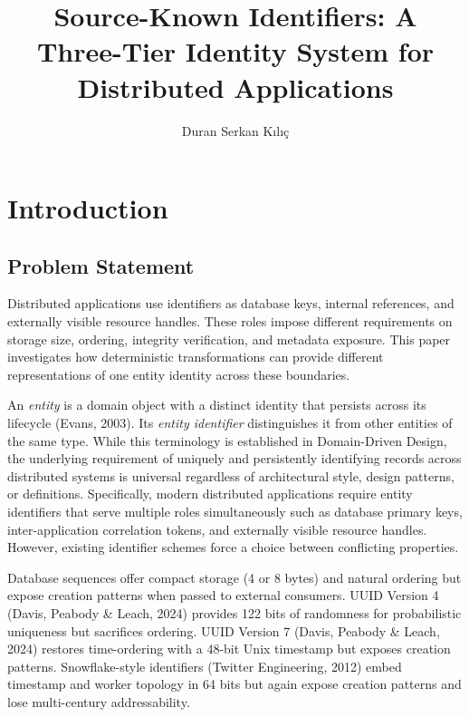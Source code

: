 \documentclass[fleqn,10pt,lineno]{wlpeerj}
\title{Source-Known Identifiers: A Three-Tier Identity System for
Distributed Applications}
\author[1]{Duran Serkan Kılıç}
\affil[1]{Independent Researcher, Ankara, Türkiye}
\begin{document}
\flushbottom
\maketitle
\thispagestyle{empty}

\raggedbottom

\newpage

\section{Introduction}\label{introduction}

\subsection{Problem Statement}\label{problem-statement}

Distributed applications use identifiers as database keys, internal
references, and externally visible resource handles. These roles impose
different requirements on storage size, ordering, integrity
verification, and metadata exposure. This paper investigates how
deterministic transformations can provide different representations of
one entity identity across these boundaries.

An \emph{entity} is a domain object with a distinct identity that
persists across its lifecycle (Evans, 2003). Its \emph{entity
identifier} distinguishes it from other entities of the same type. While
this terminology is established in Domain-Driven Design, the underlying
requirement of uniquely and persistently identifying records across
distributed systems is universal regardless of architectural style,
design patterns, or definitions. Specifically, modern distributed
applications require entity identifiers that serve multiple roles
simultaneously such as database primary keys, inter-application
correlation tokens, and externally visible resource handles. However,
existing identifier schemes force a choice between conflicting
properties.

Database sequences offer compact storage (4 or 8 bytes) and natural
ordering but expose creation patterns when passed to external consumers.
UUID Version 4 (Davis, Peabody \& Leach, 2024) provides 122 bits of
randomness for probabilistic uniqueness but sacrifices ordering. UUID
Version 7 (Davis, Peabody \& Leach, 2024) restores time-ordering with a
48-bit Unix timestamp but exposes creation patterns. Snowflake-style
identifiers (Twitter Engineering, 2012) embed timestamp and worker
topology in 64 bits but again expose creation patterns and lose
multi-century addressability.
\end{document}
